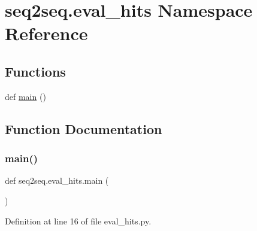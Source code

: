 \hypertarget{namespaceseq2seq_1_1eval__hits}{}\section{seq2seq.\+eval\+\_\+hits Namespace Reference}
\label{namespaceseq2seq_1_1eval__hits}
\subsection*{Functions}
\begin{DoxyCompactItemize}
\item 
def \hyperlink{namespaceseq2seq_1_1eval__hits_a6cc44d7d896f1429f58e24fb6e78a8c8}{main} ()
\end{DoxyCompactItemize}


\subsection{Function Documentation}
\mbox{\label{namespaceseq2seq_1_1eval__hits_a6cc44d7d896f1429f58e24fb6e78a8c8}} 
\subsubsection{\texorpdfstring{main()}{main()}}
{\footnotesize\ttfamily def seq2seq.\+eval\+\_\+hits.\+main (\begin{DoxyParamCaption}{ }\end{DoxyParamCaption})}



Definition at line 16 of file eval\+\_\+hits.\+py.


